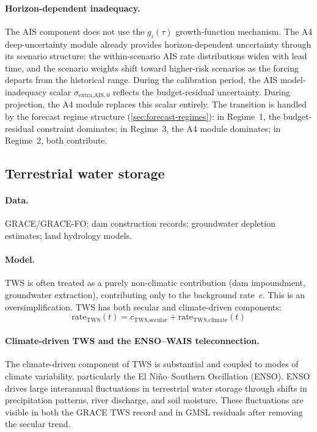 \documentclass[11pt]{article}
\begin{document}
\paragraph{Horizon-dependent inadequacy.}  The AIS component does not use the $g_i(\tau)$ growth-function mechanism.  The A4 deep-uncertainty module already provides horizon-dependent uncertainty through its scenario structure: the within-scenario AIS rate distributions widen with lead time, and the scenario weights shift toward higher-risk scenarios as the forcing departs from the historical range.  During the calibration period, the AIS model-inadequacy scalar $\sigma_{\text{extra,AIS},0}$ reflects the budget-residual uncertainty.  During projection, the A4 module replaces this scalar entirely.  The transition is handled by the forecast regime structure (\cref{sec:forecast-regimes}): in Regime~1, the budget-residual constraint dominates; in Regime~3, the A4 module dominates; in Regime~2, both contribute.

\subsection{Terrestrial water storage}
\label{sec:tws}

\paragraph{Data.}  GRACE/GRACE-FO; dam construction records; groundwater depletion estimates; land hydrology models.

\paragraph{Model.}  TWS is often treated as a purely non-climatic contribution (dam impoundment, groundwater extraction), contributing only to the background rate~$c$.  This is an oversimplification.  TWS has both secular and climate-driven components:
\begin{equation}
  \text{rate}_{\text{TWS}}(t) = c_{\text{TWS,secular}} + \text{rate}_{\text{TWS,climate}}(t)
  \label{eq:tws}
\end{equation}

\paragraph{Climate-driven TWS and the ENSO--WAIS teleconnection.}

The climate-driven component of TWS is substantial and coupled to modes of climate variability, particularly the El Ni\~no--Southern Oscillation (ENSO).  ENSO drives large interannual fluctuations in terrestrial water storage through shifts in precipitation patterns, river discharge, and soil moisture.  These fluctuations are visible in both the GRACE TWS record and in GMSL residuals after removing the secular trend.
\end{document}
